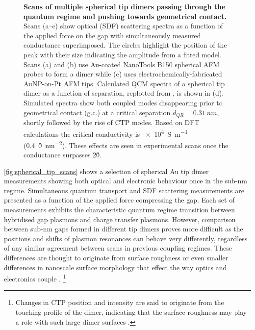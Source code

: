 \documentclass[a4paper, 11pt]{article}
\begin{document}
\begin{figure}[p]
\caption[Scans of multiple spherical tip dimers passing through the quantum regime and pushing towards geometrical contact]{\textbf{Scans of multiple spherical tip dimers passing through the quantum regime and pushing towards geometrical contact.} Scans (a--c) show optical (SDF) scattering spectra as a function of the applied force on the gap with simultaneously measured conductance superimposed. The circles highlight the position of the peak with their size indicating the amplitude from a fitted model. Scans (a) and (b) use Au-coated NanoTools B150 spherical AFM probes to form a dimer while (c) uses electrochemically-fabricated AuNP-on-Pt AFM tips. Calculated QCM spectra of a spherical tip dimer as a function of separation, replotted from \cite{savage2012}, is shown in (d). Simulated spectra show both coupled modes disappearing prior to geometrical contact (g.c.) at a critical separation $d_{QR}=\SI{0.31}{nm}$, shortly followed by the rise of CTP modes. Based on DFT calculations the critical conductivity is \SI{e4}{S.m^{-1}} (\SI{0.4}{\G0.nm^{-2}}). These effects are seen in experimental scans once the conductance surpasses 2\G0.}
\label{fig:spherical_tip_scans}
\end{figure}

\autoref{fig:spherical_tip_scans} shows a selection of spherical Au tip dimer measurements showing both optical and electronic behaviour once in the sub-nm regime. Simultaneous quantum transport and SDF scattering measurements are presented as a function of the applied force compressing the gap. Each set of measurements exhibits the characteristic quantum regime transition between hybridised gap plasmons and charge transfer plasmons. However, comparison between sub-nm gaps formed in different tip dimers proves more difficult as the positions and shifts of plasmon resonances can behave very differently, regardless of any similar agreement between scans in previous coupling regimes. These differences are thought to originate from surface roughness or even smaller differences in nanoscale surface morphology that effect the way optics and electronics couple \cite{zuloaga2009, barbry2015}.%
\footnote{Changes in CTP position and intensity are said to originate from the touching profile of the dimer, indicating that the surface roughness may play a role with such large dimer surfaces \cite{zuloaga2009, barbry2015}.}
\end{document}
